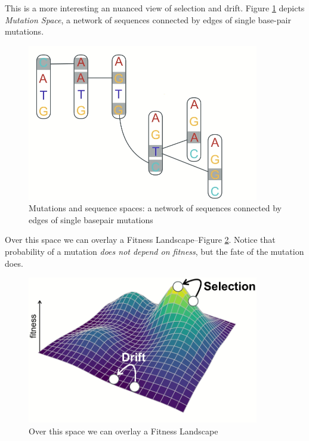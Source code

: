 \documentclass[]{article}
\begin{document}
This is a more interesting an nuanced view of selection and drift.
Figure \ref{fig:MutationSpace} depicts \textit{Mutation Space}, a network of sequences connected by edges of single base-pair mutations.
\begin{figure}[H]
	\caption[Mutations and sequence spaces]{Mutations and sequence spaces:  a network of sequences connected by edges of single basepair mutations}\label{fig:MutationSpace}
	\includegraphics[width=0.9\textwidth]{MutationSpace}
\end{figure}

 Over this space we can overlay a Fitness Landscape--Figure \ref{fig:FitnessLandscapeMovement}. Notice that probability of a mutation \textit{does not depend on fitness}, but the fate of the mutation does.
 
\begin{figure}[H]
	\caption{Over this space we can overlay a Fitness Landscape}\label{fig:FitnessLandscapeMovement}
	\includegraphics[width=0.9\textwidth]{FitnessLandscapeMovement}
\end{figure}
\end{document}

